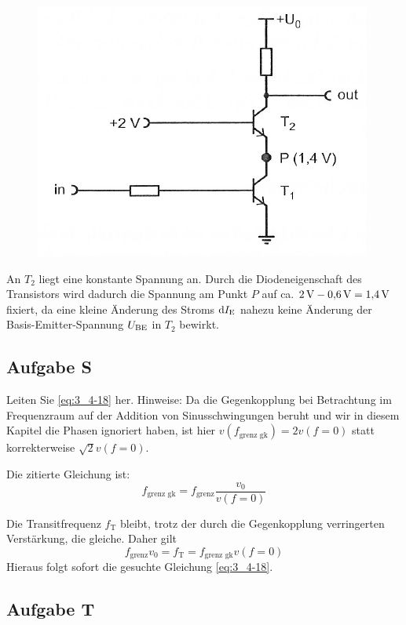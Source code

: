 \begin{figure}[htbp]
    \centering
    \includegraphics[width=.6\textwidth]{Anleitung/3_4-15.png}
    \caption{%
        \cite[Abbildung~3/4.15]{physik313-Anleitung}
    }
    \label{fig:3_4-15}
\end{figure}

An $T_2$ liegt eine konstante Spannung an. Durch die Diodeneigenschaft des
Transistors wird dadurch die Spannung am Punkt $P$ auf ca. $\SI 2{\volt} -
\SI{0.6}{\volt} = \SI{1.4}{\volt}$ fixiert, da eine kleine Änderung des Stroms
$\dif\IE$ nahezu keine Änderung der Basis-Emitter-Spannung $U_\text{BE}$ in $T_2$
bewirkt.

\FloatBarrier
\subsection{Aufgabe S}

\begin{problem}
    Leiten Sie \eqref{eq:3_4-18} her. Hinweise: Da die Gegenkopplung bei
    Betrachtung im Frequenzraum auf der Addition von Sinusschwingungen beruht
    und wir in diesem Kapitel die Phasen ignoriert haben, ist hier
    $v(f_\text{grenz gk}) = 2v(f=0)$ statt korrekterweise $\sqrt 2 v (f = 0)$.
\end{problem}

Die zitierte Gleichung ist:
\begin{equation}
    \label{eq:3_4-18}
    f_\text{grenz gk} = f_\text{grenz} \frac{v_0}{v(f=0)}
\end{equation}

Die Transitfrequenz $f_\text{T}$ bleibt, trotz der durch die Gegenkopplung
verringerten Verstärkung, die gleiche. Daher gilt
\[f_\text{grenz}v_0 = f_\text{T} = f_\text{grenz gk} v(f=0)\]
Hieraus folgt sofort die gesuchte Gleichung \eqref{eq:3_4-18}.

\FloatBarrier
\subsection{Aufgabe T}

